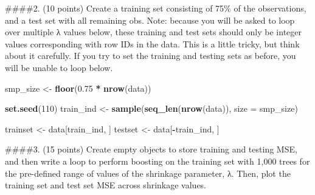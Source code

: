 \documentclass[]{article}
\newenvironment{Shaded}{\begin{snugshade}}{\end{snugshade}}
\newcommand{\DataTypeTok}[1]{\textcolor[rgb]{0.13,0.29,0.53}{#1}}
\newcommand{\DecValTok}[1]{\textcolor[rgb]{0.00,0.00,0.81}{#1}}
\newcommand{\FloatTok}[1]{\textcolor[rgb]{0.00,0.00,0.81}{#1}}
\newcommand{\KeywordTok}[1]{\textcolor[rgb]{0.13,0.29,0.53}{\textbf{#1}}}
\newcommand{\NormalTok}[1]{#1}
\newcommand{\OperatorTok}[1]{\textcolor[rgb]{0.81,0.36,0.00}{\textbf{#1}}}
\newcommand{\StringTok}[1]{\textcolor[rgb]{0.31,0.60,0.02}{#1}}
\begin{document}
\#\#\#\#2. (10 points) Create a training set consisting of 75\% of the
observations, and a test set with all remaining obs. Note: because you
will be asked to loop over multiple λ values below, these training and
test sets should only be integer values corresponding with row IDs in
the data. This is a little tricky, but think about it carefully. If you
try to set the training and testing sets as before, you will be unable
to loop below.

\begin{Shaded}
\begin{Highlighting}[]
\NormalTok{smp_size <-}\StringTok{ }\KeywordTok{floor}\NormalTok{(}\FloatTok{0.75} \OperatorTok{*}\StringTok{ }\KeywordTok{nrow}\NormalTok{(data))}

\KeywordTok{set.seed}\NormalTok{(}\DecValTok{110}\NormalTok{)}
\NormalTok{train_ind <-}\StringTok{ }\KeywordTok{sample}\NormalTok{(}\KeywordTok{seq_len}\NormalTok{(}\KeywordTok{nrow}\NormalTok{(data)), }\DataTypeTok{size =}\NormalTok{ smp_size)}

\NormalTok{trainset <-}\StringTok{ }\NormalTok{data[train_ind, ]}
\NormalTok{testset <-}\StringTok{ }\NormalTok{data[}\OperatorTok{-}\NormalTok{train_ind, ]}
\end{Highlighting}
\end{Shaded}

\#\#\#\#3. (15 points) Create empty objects to store training and
testing MSE, and then write a loop to perform boosting on the training
set with 1,000 trees for the pre-defined range of values of the
shrinkage parameter, λ. Then, plot the training set and test set MSE
across shrinkage values.
\end{document}
